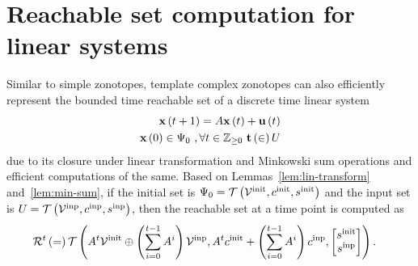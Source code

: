 \section{Reachable set computation for linear systems}

Similar to simple zonotopes, template complex zonotopes can also
efficiently represent the bounded time reachable set of a discrete
time linear system
%
\begin{align*}
{\bf x}\left(t+1\right)=A{\bf x}\left(t\right)+ {\bf u}\left(t\right)\\
{\bf x}\left(0\right)\in\Psi_0~,\forall t\in\mathbb{Z}_{\geq 0}~{\bf t}\left(\in\right)U
\end{align*}
%
due to its closure under linear transformation and Minkowski sum
operations and efficient computations of the same.  Based on
Lemmas~\ref{lem:lin-transform}
and~\ref{lem:min-sum}, if the initial set is
$\Psi_0=\mathit{\operatorname{\mathcal{T}}}\left(\mathcal{V}^{\operatorname{init}},c^{\operatorname{init}},s^{\operatorname{init}}\right)$ and the input set is
$U=\mathit{\operatorname{\mathcal{T}}}\left(\mathcal{V}^{\operatorname{inp}},c^{\operatorname{inp}},s^{\operatorname{inp}}\right)$, then the
reachable set at a time point is computed as
%
\begin{align}
& \reachset{t}=\tcztope
{%
\minsum{A^t\inittemp}{\lt(\sum_{i=0}^{t-1}A^i\rt)\inputtemp}
}
{%
A^t\initcen+\lt(\sum_{i=0}^{t-1}A^i\rt)\inputcen
}
{%
\lt[\begin{matrix}
\initsfact \\
\inputsfact
\end{matrix}
\rt]
}.
\end{align}

